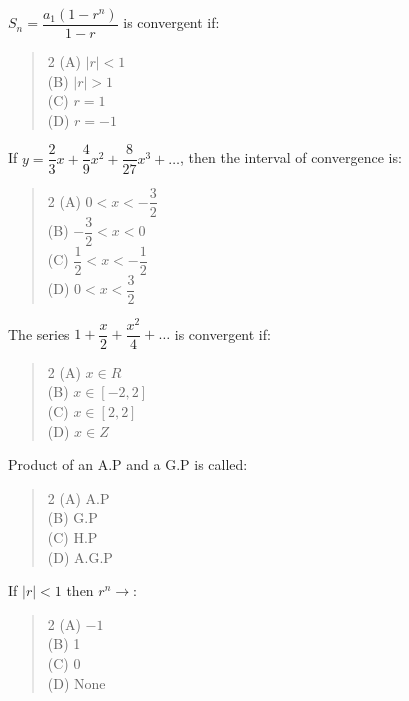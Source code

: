 \documentclass[11pt,a4paper]{article}
\begin{document}
\begin{mcqlist}
\item $S_n=\dfrac{a_1(1-r^n)}{1-r}$ is convergent if:
\begin{quote}\begin{multicols}{2}
\noindent (A) $|r|<1$ \\
(B) $|r|>1$ \\
(C) $r=1$ \\
(D) $r=-1$
\end{multicols}\end{quote}

\item If $y=\dfrac{2}{3}x+\dfrac{4}{9}x^2+\dfrac{8}{27}x^3+\ldots$, then the interval of convergence is:
\begin{quote}\begin{multicols}{2}
\noindent (A) $0<x<-\dfrac{3}{2}$ \\
(B) $-\dfrac{3}{2}<x<0$ \\
(C) $\dfrac{1}{2}<x<-\dfrac{1}{2}$ \\
(D) $0<x<\dfrac{3}{2}$
\end{multicols}\end{quote}

\item The series $1+\dfrac{x}{2}+\dfrac{x^2}{4}+\ldots$ is convergent if:
\begin{quote}\begin{multicols}{2}
\noindent (A) $x\in R$ \\
(B) $x\in[-2,2]$ \\
(C) $x\in[2,2]$ \\
(D) $x\in Z$
\end{multicols}\end{quote}

\item Product of an A.P and a G.P is called:
\begin{quote}\begin{multicols}{2}
\noindent (A) A.P \\
(B) G.P \\
(C) H.P \\
(D) A.G.P
\end{multicols}\end{quote}

\item If $|r|<1$ then $r^n\to$:
\begin{quote}\begin{multicols}{2}
\noindent (A) $-1$ \\
(B) 1 \\
(C) 0 \\
(D) None
\end{multicols}\end{quote}


\end{mcqlist}
\end{document}
